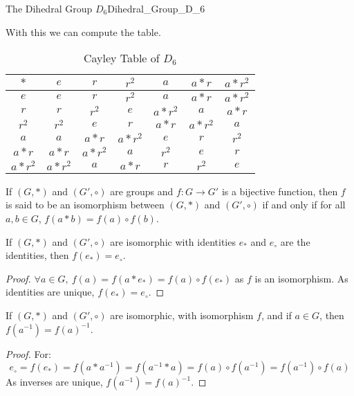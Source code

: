 \begin{lexample}{The Dihedral Group $D_{6}$}{Dihedral_Group_D_6}
\begin{figure}[H]
        \end{figure}
        With this we can compute the table.
        \begin{table}[H]
            \centering
            \captionsetup{type=table}
            \begin{tabular}{c|cccccc}
                $*$&$e$&$r$&$r^{2}$&$a$&$a*r$&$a*r^{2}$\\
                \hline
                $e$&$e$&$r$&$r^{2}$&$a$&$a*r$&$a*r^{2}$\\
                $r$&$r$&$r^{2}$&$e$&$a*r^{2}$&$a$&$a*r$\\
                $r^{2}$&$r^{2}$&$e$&$r$&$a*r$&$a*r^{2}$&$a$\\
                $a$&$a$&$a*r$&$a*r^{2}$&$e$&$r$&$r^{2}$\\
                $a*r$&$a*r$&$a*r^{2}$&$a$&$r^{2}$&$e$&$r$\\
                $a*r^{2}$&$a*r^{2}$&$a$&$a*r$&$r$&$r^{2}$&$e$
            \end{tabular}
            \caption{Cayley Table of $D_{6}$}
            \label{tab:Cayley_Table_D_6}
        \end{table}
    \end{lexample}
    \begin{definition}
        If $(G,*)$ and $(G',\circ)$ are groups and
        $f:G\rightarrow G'$ is a bijective function, then $f$ is said to
        be an isomorphism between $(G,*)$ and $(G',\circ)$ if and only if
        for all $a,b\in{G}$, $f(a*b)=f(a)\circ{f}(b)$.
    \end{definition}
    \begin{theorem}
        If $(G,*)$ and $(G',\circ)$ are isomorphic with identities $e_{*}$
        and $e_{\circ}$ are the identities, then $f(e_{*})=e_{\circ}$.
    \end{theorem}
    \begin{proof}
        $\forall a\in G,\ f(a)=f(a* e_*) = f(a)\circ f(e_*)$ as $f$ is
        an isomorphism. As identities are unique, $f(e_*)=e_{\circ}$.
    \end{proof}
    \begin{theorem}
        If $(G,*)$ and $(G',\circ)$ are isomorphic, with isomorphism $f$, and if
        $a\in{G}$, then $f(a^{\minus{1}})=f(a)^{\minus{1}}$.
    \end{theorem}
    \begin{proof}
        For:
        \begin{equation}
            e_{\circ}=f(e_*)
                     =f(a*a^{-1})
                     =f(a^{-1}*a)
                     =f(a)\circ f(a^{-1})
                     =f(a^{-1})\circ f(a)
        \end{equation}
        As inverses are unique, $f(a^{-1})=f(a)^{-1}$.
    \end{proof}
